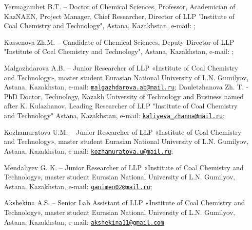 Yermagambet B.T. -- Doctor of Chemical Sciences, Professor, Academician
of KazNAEN, Project Manager, Chief Researcher, Director of LLP
"Institute of Coal Chemistry and Technology", Astana, Kazakhstan,
e-mail: \href{mailto:bake.yer@mail.ru}{};

Kassenova Zh.M. -- Candidate of Chemical Sciences, Deputy Director of
LLP "Institute of Coal Chemistry and Technology", Astana, Kazakhstan,
e-mail: \href{mailto:zhanar_k_68@mail.ru}{};

Malgazhdarova A.B. -- Junior Researcher of LLP «Institute of Coal
Chemistry and Technology», master student Eurasian National University
of L.N. Gumilyov, Astana, Kazakhstan, e-mail:
\href{mailto:malgazhdarova.ab@mail.ru}{\nolinkurl{malgazhdarova.ab@mail.ru}};
Dauletzhanova Zh. T. - PhD Doctor, Technology, Kazakh University of
Technology and Business named after K. Kulazhanov, Leading Researcher of
LLP "Institute of Coal Chemistry and Technology" Astana, Kazakhstan,
e-mail:
\href{mailto:kaliyeva_zhanna@mail.ru}{\nolinkurl{kaliyeva\_zhanna@mail.ru}};

Kozhamuratova U.M. -- Junior Researcher of LLP «Institute of Coal
Chemistry and Technology», master student Eurasian National University
of L.N. Gumilyov, Astana, Kazakhstan, e-mail:
\href{mailto:kozhamuratova.u@mail.ru}{\nolinkurl{kozhamuratova.u@mail.ru}};

Mendaliyev G. K. -- Junior Researcher of LLP «Institute of Coal
Chemistry and Technology», master student Eurasian National University
of L.N. Gumilyov, Astana, Kazakhstan, e-mail:
\href{mailto:ganimen02@mail.ru}{\nolinkurl{ganimen02@mail.ru}};

Akshekina A.S. -- Senior Lab Assistant of LLP «Institute of Coal
Chemistry and Technology», master student Eurasian National University
of L.N. Gumilyov, Astana, Kazakhstan, e-mail:
\href{mailto:akshekina11@gmail.com}{\nolinkurl{akshekina11@gmail.com}}\